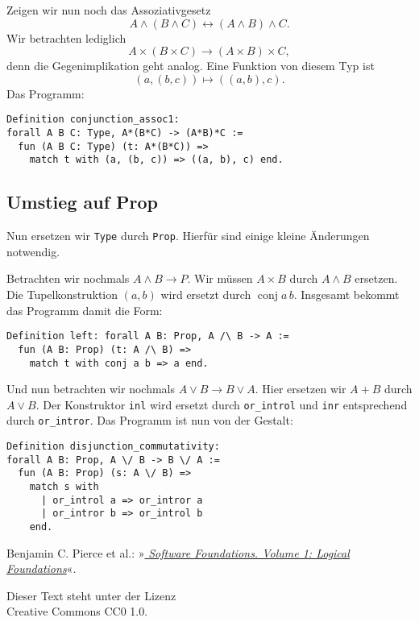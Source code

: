 \documentclass[a4paper,10pt,fleqn,twocolumn,twoside,dvipdfmx]{scrartcl}
\numberwithin{equation}{section}
\begin{document}
Zeigen wir nun noch das Assoziativgesetz
\begin{equation}
A\land (B\land C) \leftrightarrow (A\land B)\land C.
\end{equation}
Wir betrachten lediglich
\begin{equation}
A\times (B\times C) \to (A\times B)\times C,
\end{equation}
denn die Gegenimplikation geht analog.
Eine Funktion von diesem Typ ist
\begin{equation}
(a, (b, c))\mapsto ((a, b), c).
\end{equation}
Das Programm:
\begin{lstlisting}[language=Coq]
Definition conjunction_assoc1:
forall A B C: Type, A*(B*C) -> (A*B)*C :=
  fun (A B C: Type) (t: A*(B*C)) =>
    match t with (a, (b, c)) => ((a, b), c) end.
\end{lstlisting}

\subsection{Umstieg auf Prop}

Nun ersetzen wir \texttt{Type} durch \texttt{Prop}.
Hierfür sind einige kleine Änderungen notwendig.

Betrachten wir nochmals $A\land B\to P$. Wir müssen $A\times B$
durch $A\land B$ ersetzen. Die Tupelkonstruktion
$(a,b)$ wird ersetzt durch $\operatorname{conj} a\, b$.
Insgesamt bekommt das Programm damit die Form:

\begin{lstlisting}[language=Coq]
Definition left: forall A B: Prop, A /\ B -> A :=
  fun (A B: Prop) (t: A /\ B) =>
    match t with conj a b => a end.
\end{lstlisting}

\noindent
Und nun betrachten wir nochmals $A\lor B\to B\lor A$.
Hier ersetzen wir $A+B$ durch $A\lor B$.
Der Konstruktor \texttt{inl} wird ersetzt durch
\texttt{or\_introl} und \texttt{inr} entsprechend durch
\texttt{or\_intror}. Das Programm ist nun von der Gestalt:

\begin{lstlisting}[language=Coq]
Definition disjunction_commutativity:
forall A B: Prop, A \/ B -> B \/ A :=
  fun (A B: Prop) (s: A \/ B) =>
    match s with
      | or_introl a => or_intror a
      | or_intror b => or_introl b
    end.
\end{lstlisting}

\newpage
\begin{thebibliography}{00}
 Benjamin C. Pierce et al.:
»\href{https://softwarefoundations.cis.upenn.edu/lf-current/index.html}{%
\emph{Software Foundations. Volume 1: Logical Foundations}}«.
\end{thebibliography}


\vfill
\noindent
{\small Dieser Text steht unter der Lizenz\\
Creative Commons CC0 1.0.}
\end{document}
